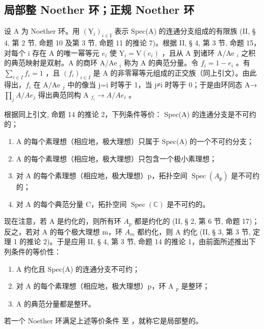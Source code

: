 \subsection{局部整 Noether 环；正规 Noether 环}

设 A 为 Noether 环。用 \((\mathrm{Y}_{i})_{i\in\mathrm{I}}\) 表示 Spec(A) 的连通分支组成的有限族 (II, § 4, 第 2 节, 命题 10 及第 3 节, 命题 11 的推论 7)。根据 II, § 4, 第 3 节, 命题 15，对每个 i 存在 A 的唯一幂等元 \(e_{i}\) 使 \(\mathrm{Y}_{i}=\mathrm{V}(e_{i})\) ，且从 A 到诸环 A/Ae \(_{i}\) 之积的典范映射是双射。A 的商环 A/Ae \(_{i}\) 称为 A 的典范分量。令 \(f_{i}=1-e_{i}\) 。有 \(\sum_{i\in I}f_{i}=1\) ，且 \((f_{i})_{i\in I}\) 是 A 的非零幂等元组成的正交族（同上引文）。由此得出，\(f_{i}\) 在 A/Ae \(_{j}\) 中的像当 j=i 时等于 1，当 j≠i 时等于 0；于是由环同态 A→ \(\prod_{j}A/Ae_{j}\) 得出典范同构 A \(_{f_{i}}\rightarrow A/Ae_{i}\) 。

根据同上引文, 命题 14 的推论 2，下列条件等价： Spec(A) 的连通分支是不可约的；

\begin{enumerate}
\def\labelenumi{(\roman{enumi})}
\setcounter{enumi}{1}
\item
  A 的每个素理想（相应地，极大理想）只属于 Spec(A) 的一个不可约分支；
\item
  A 的每个素理想（相应地，极大理想）只包含一个极小素理想；
\item
  对 A 的每个素理想（相应地，极大理想）p，拓扑空间 \(\operatorname{Spec}(A_{\mathfrak{p}})\) 是不可约的；
\item
  对 A 的每个典范分量 C，拓扑空间 \(\operatorname{Spec}(\mathbb{C})\) 是不可约的。
\end{enumerate}

现在注意，若 A 是约化的，则所有环 \(A_{p}\) 都是约化的 (II, § 2, 第 6 节, 命题 17)；反之，若对 A 的每个极大理想 m，环 \(A_{m}\) 都约化，则 A 约化 (II, § 3, 第 3 节, 定理 1 的推论 2)。于是应用 II, § 4, 第 3 节, 命题 14 的推论 1，由前面所述推出下列条件的等价性：

\begin{enumerate}
\def\labelenumi{(\roman{enumi})}
\item
  A 约化且 Spec(A) 的连通分支不可约；
\item
  对 A 的每个素理想（相应地，极大理想）p，环 A \(_{p}\) 是整环；
\item
  A 的典范分量都是整环。
\end{enumerate}

若一个 Noether 环满足上述等价条件 至 ，就称它是局部整的。

